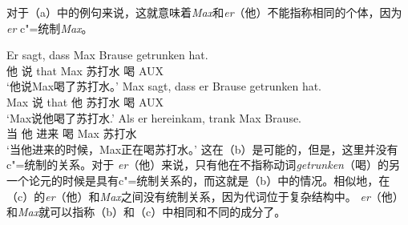对于（a）中的例句来说，这就意味着\emph{Max}和\emph{er}（他）不能指称相同的个体，因为\emph{er} c"=统制\emph{Max}。

\eal
\ex 
\gll Er sagt, dass Max Brause getrunken hat.\\
	 他 说 that Max 苏打水 喝 AUX\\
\glt `他说Max喝了苏打水。'
\ex 
\gll Max sagt, dass er Brause getrunken hat.\\
	 Max 说 that 他 苏打水 喝 AUX\\
\glt `Max说他喝了苏打水.'
\ex 
\gll Als er hereinkam, trank Max Brause.\\
	 当 他 进来 喝 Max 苏打水\\
\glt `当他进来的时候，Max正在喝苏打水。'
\zl
这在（b）是可能的，但是，这里并没有c"=统制的关系。对于 \emph{er}（他）来说，只有他在不指称动词\emph{getrunken}（喝）的另一个论元的时候是具有c"=统制关系的，而这就是（b）中的情况。相似地，在（c）的\emph{er}（他）和\emph{Max}之间没有统制关系，因为代词位于复杂结构中。 \emph{er}（他）和\emph{Max}就可以指称（b）和（c）中相同和不同的成分了。

